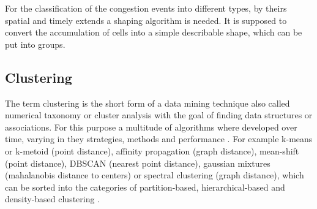 \documentclass[a4paper,headsepline,footsepline,fontsize=11pt,BCOR=12mm,DIV=12]{report}
\begin{document}
For the classification of the congestion events into different types, by theirs spatial and timely extends a shaping algorithm is needed. It is supposed to convert the accumulation of cells into a simple describable shape, which can be put into groups.

\subsection{Clustering}
\label{methodology_clustering}
The term clustering is the short form of a data mining technique also called numerical taxonomy or cluster analysis with the goal of finding data structures or associations. For this purpose a multitude of algorithms where developed over time, varying in they strategies, methods and performance \cite{Busch2004}. For example k-means or k-metoid (point distance), affinity propagation (graph distance), mean-shift (point distance), DBSCAN (nearest point distance), gaussian mixtures (mahalanobis distance to centers) or spectral clustering (graph distance), which can be sorted into the categories of partition-based, hierarchical-based and density-based clustering \cite{Chauhan2020,Yildirim2020}.

\end{document}
